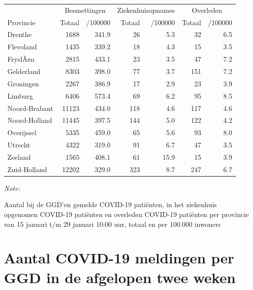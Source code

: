 \documentclass[
  english,
  man,floatsintext]{apa6}
\begin{document}
\begin{table}[H]
\centering
\begin{threeparttable}
\begin{tabular}{lrrrrrr}
\toprule
\multicolumn{1}{c}{ } & \multicolumn{2}{c}{Besmettingen} & \multicolumn{2}{c}{Ziekenhuisopnames} & \multicolumn{2}{c}{Overleden} \\
\cmidrule(l{3pt}r{3pt}){2-3} \cmidrule(l{3pt}r{3pt}){4-5} \cmidrule(l{3pt}r{3pt}){6-7}
Provincie & Totaal & /100000 & Totaal & /100000 & Totaal & /100000\\
\midrule
Drenthe & 1688 & 341.9 & 26 & 5.3 & 32 & 6.5\\
Flevoland & 1435 & 339.2 & 18 & 4.3 & 15 & 3.5\\
FryslÃ¢n & 2815 & 433.1 & 23 & 3.5 & 47 & 7.2\\
Gelderland & 8303 & 398.0 & 77 & 3.7 & 151 & 7.2\\
Groningen & 2267 & 386.9 & 17 & 2.9 & 23 & 3.9\\
Limburg & 6406 & 573.4 & 69 & 6.2 & 95 & 8.5\\
Noord-Brabant & 11123 & 434.0 & 118 & 4.6 & 117 & 4.6\\
Noord-Holland & 11445 & 397.5 & 144 & 5.0 & 122 & 4.2\\
Overijssel & 5335 & 459.0 & 65 & 5.6 & 93 & 8.0\\
Utrecht & 4322 & 319.0 & 91 & 6.7 & 47 & 3.5\\
Zeeland & 1565 & 408.1 & 61 & 15.9 & 15 & 3.9\\
Zuid-Holland & 12202 & 329.0 & 323 & 8.7 & 247 & 6.7\\
\bottomrule
\end{tabular}
\begin{tablenotes}
\item \textit{Note: } 
\item Aantal bij de GGD’en gemelde COVID-19 patiënten, in het ziekenhuis opgenomen COVID-19 patiënten en overleden COVID-19 patiënten per provincie van 15 januari t/m 29 januari 10:00 uur, totaal en per 100.000 inwoners
\end{tablenotes}
\end{threeparttable}
\end{table}

\newpage

\hypertarget{aantal-covid-19-meldingen-per-ggd-in-de-afgelopen-twee-weken}{%
\section{Aantal COVID-19 meldingen per GGD in de afgelopen twee weken}\label{aantal-covid-19-meldingen-per-ggd-in-de-afgelopen-twee-weken}}
\end{document}
